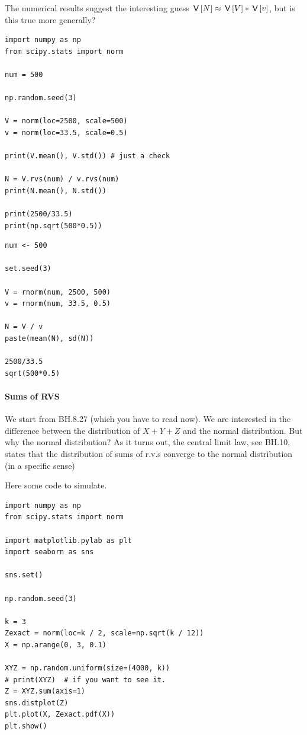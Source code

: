 \documentclass[assignments]{subfiles}
\begin{document}
The numerical results suggest the interesting guess $\,\mathsf{V}\left[N\right] \approx \,\mathsf{V}\left[V\right] * \,\mathsf{V}\left[v\right]$, but is this true more generally?

\begin{verbatim}
import numpy as np
from scipy.stats import norm

num = 500

np.random.seed(3)

V = norm(loc=2500, scale=500)
v = norm(loc=33.5, scale=0.5)

print(V.mean(), V.std()) # just a check

N = V.rvs(num) / v.rvs(num)
print(N.mean(), N.std())

print(2500/33.5)
print(np.sqrt(500*0.5))
\end{verbatim}

\begin{verbatim}
num <- 500

set.seed(3)

V = rnorm(num, 2500, 500)
v = rnorm(num, 33.5, 0.5)

N = V / v
paste(mean(N), sd(N))

2500/33.5
sqrt(500*0.5)
\end{verbatim}



\paragraph{Sums of RVS}

We start from BH.8.27 (which you have to read now).  We are interested in the difference between the distribution of $X+Y+Z$ and the normal distribution. But why the normal distribution? As it turns out, the central limit law, see BH.10, states that the distribution of sums of r.v.s converge to the normal distribution (in a specific sense)

Here some code to simulate.

\begin{verbatim}
import numpy as np
from scipy.stats import norm

import matplotlib.pylab as plt
import seaborn as sns

sns.set()

np.random.seed(3)

k = 3
Zexact = norm(loc=k / 2, scale=np.sqrt(k / 12))
X = np.arange(0, 3, 0.1)

XYZ = np.random.uniform(size=(4000, k))
# print(XYZ)  # if you want to see it.
Z = XYZ.sum(axis=1)
sns.distplot(Z)
plt.plot(X, Zexact.pdf(X))
plt.show()
\end{verbatim}
\end{document}
